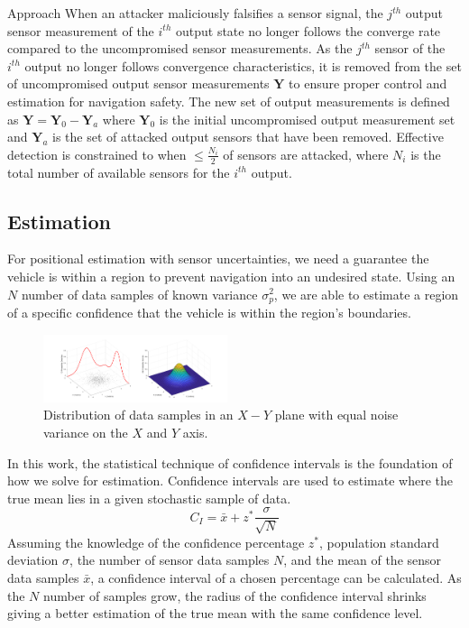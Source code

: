 \begin{section}{Approach}
When an attacker maliciously falsifies a sensor signal, the $j^{th}$ output sensor measurement of the $i^{th}$ output state no longer follows the converge rate compared to the uncompromised sensor measurements. As the $j^{th}$ sensor of the $i^{th}$ output no longer follows convergence characteristics, it is removed from the set of uncompromised output sensor measurements $\bm{Y}$ to ensure proper control and estimation for navigation safety. The new set of output measurements is defined as $\bm{Y}=\bm{Y}_0-\bm{Y}_a$ where $\bm{Y}_0$ is the initial uncompromised output measurement set and $\bm{Y}_a$ is the set of attacked output sensors that have been removed. Effective detection is constrained to when $\leq \frac{N_i}{2}$ of sensors are attacked, where $N_i$ is the total number of available sensors for the $i^{th}$ output.



\subsection{Estimation}
For positional estimation with sensor uncertainties, we need a guarantee the vehicle is within a region to prevent navigation into an undesired state. Using an $N$ number of data samples of known variance $\sigma_p^2$, we are able to estimate a region of a specific confidence that the vehicle is within the region's boundaries.
\begin{figure}[ht!]
\vspace{1pt}
\centering
\includegraphics[width=0.48\textwidth]{GaussianPDF.png}
\caption{Distribution of data samples in an $X-Y$ plane with equal noise variance on the $X$ and $Y$ axis.}
\label{fig:gauss_pdf}
\end{figure}
In this work, the statistical technique of confidence intervals is the foundation of how we solve for estimation. Confidence intervals are used to estimate where the true mean lies in a given stochastic sample of data. 
    \begin{equation}
     \label{Confidence_interval}
		C_I = \bar{x} + z^{*}\frac{\sigma}{\sqrt{N}}
	\end{equation}
Assuming the knowledge of the confidence percentage $z^{*}$, population standard deviation $ \sigma $, the number of sensor data samples $N$, and the mean of the sensor data samples $ \bar{x} $, a confidence interval of a chosen percentage can be calculated. As the $N$ number of samples grow, the radius of the confidence interval shrinks giving a better estimation of the true mean with the same confidence level.


\end{section}
